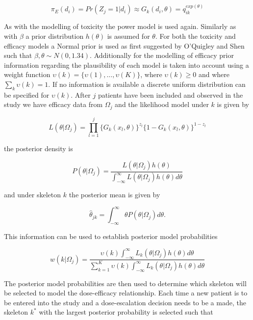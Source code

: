 \begin{equation}
\pi_E(d_i) = Pr(Z_j = 1|d_i) \approx G_k(d_i,\theta) = q_{ik} ^{exp(\theta)}
\end{equation}

As with the modelling of toxicity the power model is used again. Similarly as with $\beta$ a prior distribution $h(\theta)$ is assumed for $\theta$. For both the toxicity and efficacy models a Normal prior is used as first suggested by O'Quigley and Shen \cite{oquigleyContinualReassessmentMethod1996} such that $\beta, \theta \sim N(0,1.34)$. Additionally for the modelling of efficacy prior information regarding the plausibility of each model is taken into account using a weight function $\upsilon(k) = \{\upsilon(1), ..., \upsilon(K)\}$, where $\upsilon(k) \geq 0$ and where $\sum_k \upsilon(k) = 1$. If no information is available a discrete uniform distribution can be specified for $\upsilon(k)$. After $j$ patients have been included and observed in the study we have efficacy data from $\Omega_j$ and the likelihood model under $k$ is given by 

\begin{equation}
L(\theta|\Omega_j)=\prod_{l=1}^{j}\{G_k(x_l,\theta)\}^{z_l}\{1-G_k(x_l,\theta)\}^{1-z_l}  
\end{equation}

the posterior density is 

\begin{equation}
P(\theta|\Omega_j) = \frac{L(\theta|\Omega_j)h(\theta)}{\int_{-\infty}^{\infty}L(\theta|\Omega_j)h(\theta)d\theta}
\end{equation}

and under skeleton $k$ the posterior mean is given by 

\begin{equation}
\hat{\theta}_{jk} = \int_{-\infty}^{\infty}\theta P(\theta|\Omega_j)d\theta.
\end{equation} 

This information can be used to establish posterior model probabilities 

\begin{equation}
w(k|\Omega_j) = \frac{\upsilon(k)\int_{-\infty}^{\infty}L_k(\theta|\Omega_j)h(\theta)d\theta}{\sum_{k=1}^{K}\upsilon(k)\int_{-\infty}^{\infty}L_k(\theta|\Omega_j)h(\theta)d\theta}
\end{equation}

The posterior model probabilities are then used to determine which skeleton will be selected to model the dose-efficacy relationship. Each time a new patient is to be entered into the study and a dose-escalation decision needs to be a made, the skeleton $k^*$ with the largest posterior probability is selected such that

